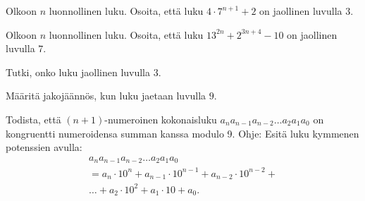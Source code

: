 \begin{tehtavasivu}
\begin{tehtava}
  Olkoon $n$ luonnollinen luku. Osoita, että luku $4\cdot 7^{n+1}+2$ on jaollinen luvulla $3$.
\end{tehtava}

\begin{tehtava}
  Olkoon $n$ luonnollinen luku. Osoita, että luku $13^{2n} + 2^{3n+4} - 10$ on jaollinen luvulla $7$.
\end{tehtava}

\begin{tehtava}
  Tutki, onko luku jaollinen luvulla $3$.
  \begin{alakohdat}
  \end{alakohdat}
\end{tehtava}

\begin{tehtava}
  Määritä jakojäännös, kun luku jaetaan luvulla $9$.
  \begin{alakohdat}
  \end{alakohdat}
\end{tehtava}

\begin{tehtava}
  Todista, että $(n+1)$-numeroinen kokonaisluku $a_na_{n-1}a_{n-2}\ldots a_2a_1a_0$ on kongruentti numeroidensa summan kanssa modulo 9. Ohje: Esitä luku kymmenen potenssien avulla:
  \begin{multline*}
  a_na_{n-1}a_{n-2}\ldots a_2a_1a_0\\ = a_n \cdot 10^n + a_{n-1}\cdot 10^{n-1} + a_{n-2} \cdot 10^{n-2} + \\
  \ldots + a_2 \cdot 10^2 + a_1 \cdot 10 + a_0.
  \end{multline*}
\end{tehtava}

\begin{tehtava}
  \begin{alakohdat}
  \end{alakohdat}
\end{tehtava}

\end{tehtavasivu}


